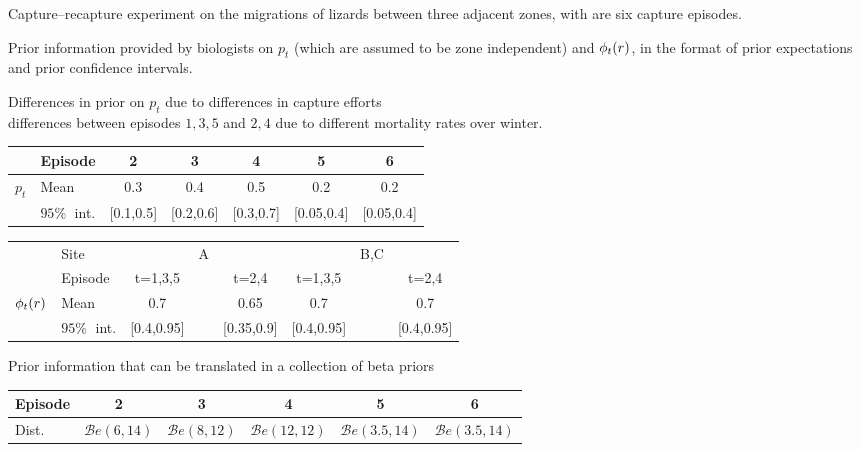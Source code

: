 \begin{slide}
Capture--recapture experiment on the migrations of lizards between three adjacent zones, with
are six capture episodes. 

\vs\pause
Prior information provided by biologists on 
$p_t$ (which are assumed to be zone independent) and ${{\phi}_t(r)}$, 
in the format of prior expectations and prior confidence intervals.

\vs\pause
Differences in prior on $p_t$ due to differences in capture efforts\\
differences between episodes $1,3,5$ and 
$2,4$ due to different mortality rates over winter.

\end{slide}\begin{slide}

\footnotesize
\begin{tabular}{cl|ccccc}
\hline
&Episode  & 2   & 3    & 4   & 5  & 6 \\
\hline
$p_t$  &Mean  & 0.3  & 0.4  & 0.5  & 0.2  & 0.2 \\
&$95\% \;$ int.& [0.1,0.5]  & [0.2,0.6]  & [0.3,0.7] & [0.05,0.4] & [0.05,0.4]\\
\end{tabular}

\begin{tabular}{cl|ccc|ccc}
\hline
&Site  &       &A&  & &B,C& \\
&Episode  & t=1,3,5 & & t=2,4 & t=1,3,5 & & t=2,4 \\
\hline ${{\phi}_t(r)}$
&Mean  & 0.7 & & 0.65  & 0.7 & & 0.7  \\
&$95\%\;$ int.& [0.4,0.95]& &[0.35,0.9]  & [0.4,0.95]& &[0.4,0.95]\\
\hline
\end{tabular}
\normalsize

\end{slide}\begin{slide}

Prior information that can be translated in a collection of beta priors

\pause\smallskip
\footnotesize
\begin{tabular}{l|ccccc}
\hline
Episode  & 2   & 3    & 4   & 5  & 6 \\
\hline
Dist.  & $\mathscr{B}e(6,14)$ & $\mathscr{B}e(8,12)$ & $\mathscr{B}e(12,12)$ & $\mathscr{B} e(3.5,14)$ & $\mathscr{B} e(3.5,14)$ \\
\end{tabular}


\end{slide}
